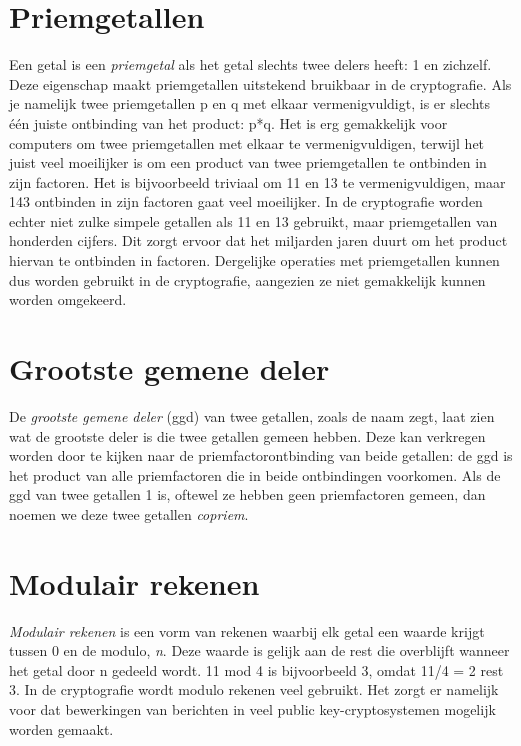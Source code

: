 \documentclass{report} %
\begin{document}
\section{Priemgetallen}
Een getal is een \textit{priemgetal} als het getal slechts twee delers heeft: 1 en zichzelf. Deze eigenschap maakt priemgetallen uitstekend bruikbaar in de cryptografie. Als je namelijk twee priemgetallen p en q met elkaar vermenigvuldigt, is er slechts één juiste ontbinding van het product: p*q. Het is erg gemakkelijk voor computers om twee priemgetallen met elkaar te vermenigvuldigen, terwijl het juist veel moeilijker is om een product van twee priemgetallen te ontbinden in zijn factoren. Het is bijvoorbeeld triviaal om 11 en 13 te vermenigvuldigen, maar 143 ontbinden in zijn factoren gaat veel moeilijker. In de cryptografie worden echter niet zulke simpele getallen als 11 en 13 gebruikt, maar priemgetallen van honderden cijfers. Dit zorgt ervoor dat het miljarden jaren duurt om het product hiervan te ontbinden in factoren. Dergelijke operaties met priemgetallen kunnen dus worden gebruikt in de cryptografie, aangezien ze niet gemakkelijk kunnen worden omgekeerd.

\section{Grootste gemene deler}
De \textit{grootste gemene deler} (ggd) van twee getallen, zoals de naam zegt, laat zien wat de grootste deler is die twee getallen gemeen hebben. Deze kan verkregen worden door te kijken naar de priemfactorontbinding van beide getallen: de ggd is het product van alle priemfactoren die in beide ontbindingen voorkomen. Als de ggd van twee getallen 1 is, oftewel ze hebben geen priemfactoren gemeen, dan noemen we deze twee getallen \textit{copriem}.

\section{Modulair rekenen}
\textit{Modulair rekenen} is een vorm van rekenen waarbij elk getal een waarde krijgt tussen 0 en de modulo, \textit{n}. Deze waarde is gelijk aan de rest die overblijft wanneer het getal door n gedeeld wordt. 11 mod 4 is bijvoorbeeld 3, omdat 11/4 = 2 rest 3. In de cryptografie wordt modulo rekenen veel gebruikt. Het zorgt er namelijk voor dat bewerkingen van berichten in veel public key-cryptosystemen mogelijk worden gemaakt. 
\end{document}
